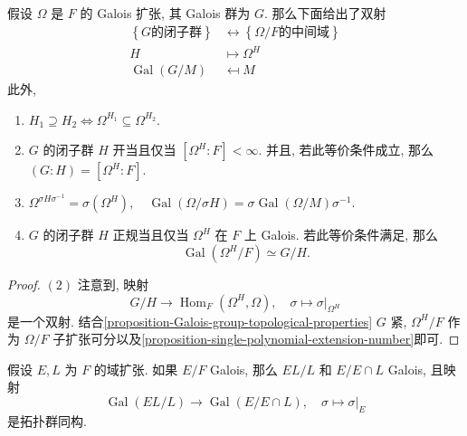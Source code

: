 \begin{theorem}
  假设 \( \Omega \) 是 \( F \) 的 Galois 扩张, 其 Galois 群为 \( G \).
  那么下面给出了双射
  \[
    \begin{split}
      \left\lbrace G \text{的闭子群} \right\rbrace &\leftrightarrow \left\lbrace
      \Omega/F \text{的中间域} \right\rbrace\\ H & \mapsto \Omega^H\\
      \operatorname{Gal}(G/M) &\mapsfrom M
    \end{split}
  \]
  此外,
  \begin{enumerate}
    \item \( H_1 \supseteq H_2 \iff \Omega^{H_1} \subseteq \Omega^{H_2} \).
    \item \( G \) 的闭子群 \( H \) 开当且仅当 \( [\Omega^H: F] < \infty \).
      并且, 若此等价条件成立, 那么 \( (G: H) = [\Omega^H: F] \).
    \item \( \Omega^{\sigma H \sigma^{-1}} = \sigma(\Omega^H),\quad
      \operatorname{Gal}(\Omega/\sigma H) = \sigma
      \operatorname{Gal}(\Omega/M)\sigma^{-1} \).
    \item \( G \) 的闭子群 \( H \) 正规当且仅当 \( \Omega^H \) 在 \( F \)
      上 Galois.
      若此等价条件满足, 那么
      \[
        \operatorname{Gal}(\Omega^H / F) \simeq G / H.
      \]
  \end{enumerate}
\end{theorem}
\begin{proof}
  \( (2) \) 注意到, 映射
  \[
    G / H \to \operatorname{Hom}_{F}(\Omega^H, \Omega),\quad \sigma \mapsto
    \left. \sigma \right\vert_{\Omega^H}
  \]
  是一个双射.
  结合\cref{proposition-Galois-group-topological-properties} \( G \) 紧, \(
  \Omega^H/F \) 作为 \( \Omega/F \)
  子扩张可分以及\cref{proposition-single-polynomial-extension-number}即可.
\end{proof}

\begin{proposition}
  \label{propostion-Galois-group-of-field-composite-isomorphism}
  假设 \( E, L \) 为 \( F \) 的域扩张.
  如果 \( E/F \) Galois, 那么 \( EL/L \) 和 \( E/E \cap L \) Galois, 且映射
  \[
    \operatorname{Gal}(EL/L) \to \operatorname{Gal}(E/E \cap L),\quad \sigma
    \mapsto \left. \sigma \right\vert_{E}
  \]
  是拓扑群同构.
\end{proposition}

